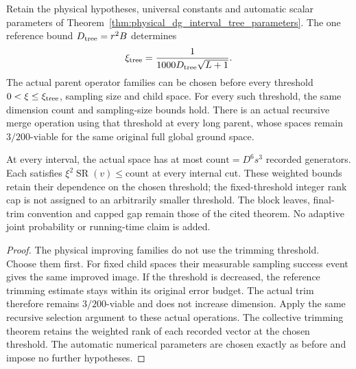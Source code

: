 \begin{lemma}
    \label{lem:physical_dg_interval_tree_common_radius}
    \leanok
    Retain the physical hypotheses, universal constants and automatic
    scalar parameters of Theorem~\ref{thm:physical_dg_interval_tree_parameters}.
    The one reference bound $D_{\rm tree}=r^2B$ determines
    \[
        \xi_{\rm tree}=\frac1{1000D_{\rm tree}\sqrt{L+1}}.
    \]
    The actual parent operator families can be chosen before every
    threshold $0<\xi\le\xi_{\rm tree}$, sampling size and child space.
    For every such threshold, the same dimension count and sampling-size
    bounds hold. There is an actual recursive merge operation using that
    threshold at every long parent, whose spaces remain $3/200$-viable
    for the same original full global ground space.

    At every interval, the actual space has at most
    $\mathrm{count}=D^6s^3$ recorded generators. Each satisfies
    $\xi^2\operatorname{SR}(v)\le\mathrm{count}$ at every internal cut.
    These weighted bounds retain their dependence on the chosen threshold;
    the fixed-threshold integer rank cap is not assigned to an arbitrarily
    smaller threshold. The block leaves, final-trim convention and capped
    gap remain those of the cited theorem. No adaptive joint probability
    or running-time claim is added.
\end{lemma}
\begin{proof}\leanok
    The physical improving families do not use the trimming threshold.
    Choose them first. For fixed child spaces their measurable sampling
    success event gives the same improved image. If the threshold is
    decreased, the reference trimming estimate stays within its original
    error budget. The actual trim therefore remains $3/200$-viable and
    does not increase dimension. Apply the same recursive selection
    argument to these actual operations. The collective trimming theorem
    retains the weighted rank of each recorded vector at the chosen
    threshold. The automatic numerical parameters are chosen exactly as
    before and impose no further hypotheses.
\end{proof}

